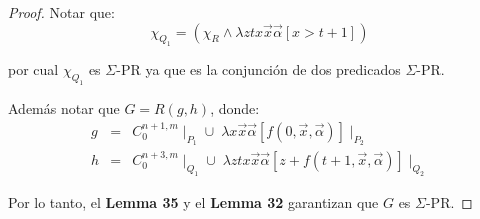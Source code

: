 \begin{proof}
    \PN Notar que:
    \[
      \chi_{Q_{1}} = (\chi_{R} \wedge \lambda ztx\vec{x} \vec{\alpha}\left[x > t+1\right])
    \]

    \PN por cual $\chi_{Q_{1}}$ es $\Sigma$-PR ya que es la conjunción de dos predicados $\Sigma$-PR.

    \PN Además notar que $G = R(g, h)$, donde:
    \begin{eqnarray*}
      g &=& C_{0}^{n+1,m} \mid_{P_{1}} \cup \; \lambda x\vec{x}\vec{\alpha}\left[f(0,\vec{x},\vec{\alpha})\right]
        \mid_{P_{2}} \\
      h &=& C_{0}^{n+3,m} \mid_{Q_{1}} \cup \; \lambda ztx\vec{x}\vec{\alpha}\left[z+f(t+1,\vec{x},\vec{\alpha})\right]
        \mid_{Q_{2}}
    \end{eqnarray*}

    \PN Por lo tanto, el \textbf{Lemma 35} y el \textbf{Lemma 32} garantizan que $G$ es $\Sigma$-PR.
  \end{proof}

